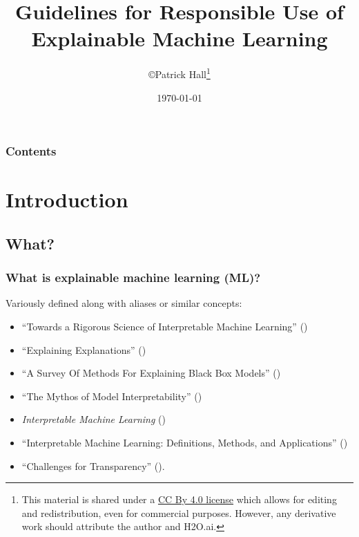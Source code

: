 \documentclass[11pt,
               aspectratio=169,
               hyperref={colorlinks}
               ]{beamer}
\author{\copyright\hspace{1pt}Patrick Hall\footnote{\tiny{This material is shared under a \href{https://creativecommons.org/licenses/by/4.0/deed.ast}{CC By 4.0 license} which allows for editing and redistribution, even for commercial purposes. However, any derivative work should attribute the author and H2O.ai.}}}
\title{Guidelines for Responsible Use of Explainable Machine Learning}
\institute{\href{https://www.h2o.ai}{H\textsubscript{2}O.ai}}
\date{\today}
\begin{document}
	
	\maketitle
	
	\begin{frame}
	
		\frametitle{Contents}
		
		\tableofcontents{}
		
	\end{frame}

	\section{Introduction}

	\subsection{What?}


	\begin{frame}[t]
		
		\frametitle{What is explainable machine learning (ML)?}
		
		Variously defined along with aliases or similar concepts:
		\vspace{5pt}
		\begin{itemize}\footnotesize
			\item ``Towards a Rigorous Science of Interpretable Machine Learning'' (\citet{been_kim1})
			\item ``Explaining Explanations'' (\citet{gilpin2018explaining})
			\item ``A Survey Of Methods For Explaining Black Box Models'' (\citet{guidotti2018survey})
			\item ``The Mythos of Model Interpretability'' (\citet{lipton1})
		 	\item \textit{Interpretable Machine Learning} (\citet{molnar})
			\item ``Interpretable Machine Learning: Definitions, Methods, and Applications'' (\citet{murdoch2019interpretable})
			\item ``Challenges for Transparency'' (\citet{weller2017challenges}). 
		\end{itemize}\normalsize
		
	\end{frame}
	
\end{document}
